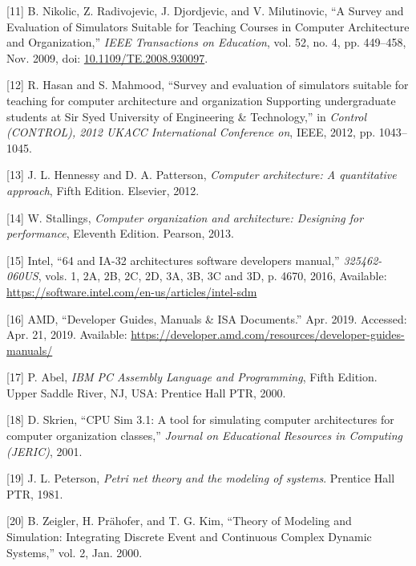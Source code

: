 \documentclass[12pt,twoside]{templates/unerthesis}
\begin{document}
\leavevmode\hypertarget{ref-nikolic_survey_2009}{}%
{[}11{]} B. Nikolic, Z. Radivojevic, J. Djordjevic, and V. Milutinovic, ``A Survey and Evaluation of Simulators Suitable for Teaching Courses in Computer Architecture and Organization,'' \emph{IEEE Transactions on Education}, vol. 52, no. 4, pp. 449--458, Nov. 2009, doi: \href{https://doi.org/10.1109/TE.2008.930097}{10.1109/TE.2008.930097}.

\leavevmode\hypertarget{ref-hasan_survey_2012}{}%
{[}12{]} R. Hasan and S. Mahmood, ``Survey and evaluation of simulators suitable for teaching for computer architecture and organization Supporting undergraduate students at Sir Syed University of Engineering \& Technology,'' in \emph{Control (CONTROL), 2012 UKACC International Conference on}, IEEE, 2012, pp. 1043--1045.

\leavevmode\hypertarget{ref-hennessy_computer_2012}{}%
{[}13{]} J. L. Hennessy and D. A. Patterson, \emph{Computer architecture: A quantitative approach}, Fifth Edition. Elsevier, 2012.

\leavevmode\hypertarget{ref-stallings_computer_2013}{}%
{[}14{]} W. Stallings, \emph{Computer organization and architecture: Designing for performance}, Eleventh Edition. Pearson, 2013.

\leavevmode\hypertarget{ref-intel_64_2016}{}%
{[}15{]} Intel, ``64 and IA-32 architectures software developers manual,'' \emph{325462-060US}, vols. 1, 2A, 2B, 2C, 2D, 3A, 3B, 3C and 3D, p. 4670, 2016, Available: \url{https://software.intel.com/en-us/articles/intel-sdm}

\leavevmode\hypertarget{ref-amd_developer_2019}{}%
{[}16{]} AMD, ``Developer Guides, Manuals \& ISA Documents.'' Apr. 2019. Accessed: Apr. 21, 2019. Available: \url{https://developer.amd.com/resources/developer-guides-manuals/}

\leavevmode\hypertarget{ref-abel_ibm_2000}{}%
{[}17{]} P. Abel, \emph{IBM PC Assembly Language and Programming}, Fifth Edition. Upper Saddle River, NJ, USA: Prentice Hall PTR, 2000.

\leavevmode\hypertarget{ref-skrien_cpu_2001}{}%
{[}18{]} D. Skrien, ``CPU Sim 3.1: A tool for simulating computer architectures for computer organization classes,'' \emph{Journal on Educational Resources in Computing (JERIC)}, 2001.

\leavevmode\hypertarget{ref-peterson_petri_1981}{}%
{[}19{]} J. L. Peterson, \emph{Petri net theory and the modeling of systems}. Prentice Hall PTR, 1981.

\leavevmode\hypertarget{ref-zeigler_theory_2000}{}%
{[}20{]} B. Zeigler, H. Prähofer, and T. G. Kim, ``Theory of Modeling and Simulation: Integrating Discrete Event and Continuous Complex Dynamic Systems,'' vol. 2, Jan. 2000.
\end{document}
